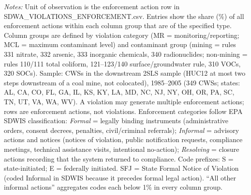 \begin{table}[htbp]
\begin{minipage}{\linewidth}
\textit{Notes:} Unit of observation is the enforcement action row in SDWA\_VIOLATIONS\_ENFORCEMENT.csv. Entries show the share (\%) of all enforcement actions within each column group that are of the specified type. Column groups are defined by violation category (MR = monitoring/reporting; MCL = maximum contaminant level) and contaminant group (mining = rules 331 nitrate, 332 arsenic, 333 inorganic chemicals, 340 radionuclides; non-mining = rules 110/111 total coliform, 121--123/140 surface/groundwater rule, 310 VOCs, 320 SOCs). Sample: CWSs in the downstream 2SLS sample (HUC12 at most two steps downstream of a coal mine, not colocated), 1985--2005 (349 CWSs; states: AL, CA, CO, FL, GA, IL, KS, KY, LA, MD, NC, NJ, NY, OH, OR, PA, SC, TN, UT, VA, WA, WV). A violation may generate multiple enforcement actions; rows are enforcement actions, not violations. Enforcement categories follow EPA SDWIS classification: \textit{Formal} = legally binding instruments (administrative orders, consent decrees, penalties, civil/criminal referrals); \textit{Informal} = advisory actions and notices (notices of violation, public notification requests, compliance meetings, technical assistance visits, intentional no-action); \textit{Resolving} = closure actions recording that the system returned to compliance. Code prefixes: S = state-initiated; E = federally initiated. SFJ = State Formal Notice of Violation (coded Informal in SDWIS because it precedes formal legal action). ``All other informal actions'' aggregates codes each below 1\% in every column group.
\end{minipage}
\end{table}
